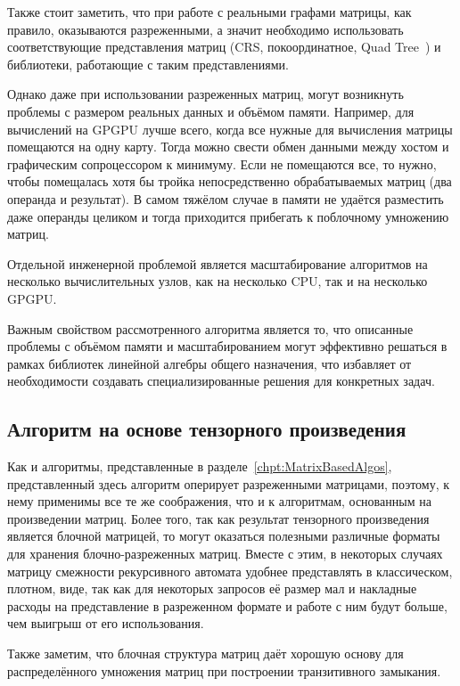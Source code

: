 Также стоит заметить, что при работе с реальными графами матрицы, как правило, оказываются разреженными, а значит необходимо использовать соответствующие представления матриц (CRS, покоординатное, Quad Tree~\cite{quadtree}) и библиотеки, работающие с таким представлениями.

Однако даже при использовании разреженных матриц, могут возникнуть проблемы с размером реальных данных и объёмом памяти.
Например, для вычислений на GPGPU лучше всего, когда все нужные для вычисления матрицы помещаются на одну карту.
Тогда можно свести обмен данными между хостом и графическим сопроцессором к минимуму.
Если не помещаются все, то нужно, чтобы помещалась хотя бы тройка непосредственно обрабатываемых матриц (два операнда и результат).
В самом тяжёлом случае в памяти не удаётся разместить даже операнды целиком и тогда приходится прибегать к поблочному умножению матриц.

Отдельной инженерной проблемой является масштабирование алгоритмов на несколько вычислительных узлов, как на несколько CPU, так и на несколько GPGPU.

Важным свойством рассмотренного алгоритма является то, что описанные проблемы с объёмом памяти и масштабированием могут эффективно решаться в рамках библиотек линейной алгебры общего назначения, что избавляет от необходимости создавать специализированные решения для конкретных задач.

\subsection{Алгоритм на основе тензорного произведения}

Как и алгоритмы, представленные в разделе~\ref{chpt:MatrixBasedAlgos}, представленный здесь алгоритм оперирует разреженными матрицами, поэтому, к нему применимы все те же соображения, что и к алгоритмам, основанным на произведении матриц. Более того, так как результат тензорного произведения является блочной матрицей, то могут оказаться полезными различные форматы для хранения блочно-разреженных матриц. Вместе с этим, в некоторых случаях матрицу смежности рекурсивного автомата удобнее представлять в классическом, плотном, виде, так как для некоторых запросов её размер мал и накладные расходы на представление в разреженном формате и работе с ним будут больше, чем выигрыш от его использования.


Также заметим, что блочная структура матриц даёт хорошую основу для распределённого умножения матриц при построении транзитивного замыкания.

